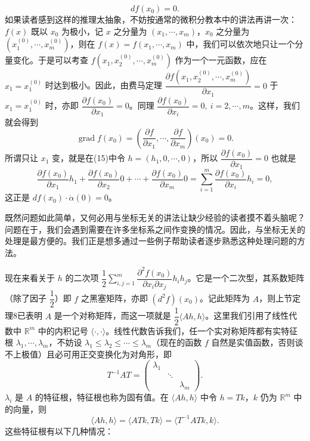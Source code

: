 \[
 df(x_0)=0.
\]
如果读者感到这样的推理太抽象，不妨按通常的微积分教本中的讲法再讲一次：$f(x)$ 既以 $x_0$ 为极小，记 $x$ 之分量为 $(x_1,\cdots,x_m)$，$x_0$ 之分量为 $(x_1^{(0)},\cdots,x_m^{(0)})$，则在 $f(x)=f(x_1,\cdots,x_m)$ 中，我们可以依次地只让一个分量变化。于是可以考查 $f(x_1,x_2^{(0)},\cdots,x_m^{(0)})$ 作为一个一元函数，应在 $x_1=x_1^{(0)}$ 时达到极小。因此，由费马定理 $\dfrac{\partial f(x_1,x_2^{(0)},\cdots,x_m^{(0)})}{\partial x_1}=0$ 于 $x_1=x_1^{(0)}$ 时，亦即 $\dfrac{\partial f(x_0)}{\partial x_1}=0$。同理 $\dfrac{\partial f(x_0)}{\partial x_i}=0,\ i=2,\cdots,m$。这样，我们就会得到
\begin{equation}
 \operatorname{grad}f(x_0)=\left(\frac{\partial f}{\partial x_1},\cdots,\frac{\partial f}{\partial x_m}\right)(x_0)=0.
 \tag{16}
\end{equation}
所谓只让 $x_1$ 变，就是在(15)中令 $h=(h_1,0,\cdots,0)$，所以 $\dfrac{\partial f(x_0)}{\partial x_1}=0$ 也就是
\[
 \frac{\partial f(x_0)}{\partial x_1}h_1+\frac{\partial f(x_0)}{\partial x_2}0+\cdots+\frac{\partial f(x_0)}{\partial x_m}0
 =\sum_{i=1}^m\frac{\partial f(x_0)}{\partial x_i}h_i=0,
\]
这正是 $df(x_0)\cdot\dot\alpha(0)=0$。

既然问题如此简单，又何必用与坐标无关的讲法让缺少经验的读者摸不着头脑呢？问题在于，我们会遇到需要在许多坐标系之间作变换的情况。因此，与坐标无关的处理是最方便的。我们正是想多通过一些例子帮助读者逐步熟悉这种处理问题的方法。

现在来看关于 $h$ 的二次项 $\dfrac12\sum_{i,j=1}^m\dfrac{\partial^2f(x_0)}{\partial x_i\partial x_j}h_i h_j$。它是一个二次型，其系数矩阵（除了因子 $\dfrac12$）即 $f$ 之黑塞矩阵，亦即 $(d^2f)(x_0)$。记此矩阵为 $A$，则上节定理8已表明 $A$ 是一个对称矩阵，而这一项就是 $\dfrac12\langle Ah,h\rangle$。这里我们引用了线性代数中 $\mathbb R^m$ 中的内积记号 $\langle\cdot,\cdot\rangle$。线性代数告诉我们，任一个实对称矩阵都有实特征根 $\lambda_1,\cdots,\lambda_m$，不妨设 $\lambda_1\le\lambda_2\le\cdots\le\lambda_m$（现在的函数 $f$ 自然是实值函数，否则谈不上极值）且必可用正交变换化为对角形，即
\begin{equation}
 T^{-1}AT=
 \begin{pmatrix}
 \lambda_1&&\\
 &\ddots&\\
 &&\lambda_m
 \end{pmatrix}.
 \tag{17}
\end{equation}
$\lambda_i$ 是 $A$ 的特征根，特征根也称为固有值。在 $\langle Ah,h\rangle$ 中令 $h=Tk$，$k$ 仍为 $\mathbb R^m$ 中的向量，则
\[
 \langle Ah,h\rangle=\langle ATk,Tk\rangle=\langle T^{-1}ATk,k\rangle.
\]
这些特征根有以下几种情况：

